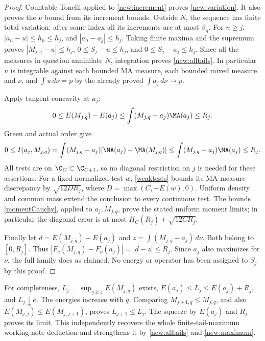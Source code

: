 \begin{proof}
Countable Tonelli applied to \eqref{new:increment} proves
\eqref{new:variation}. It also proves the $\nu$ bound from its
increment bounds. Outside $N$, the sequence has finite total variation:
after some index all its increments are at most $\beta_n$. For
$n\ge j$, $|a_n-u|\le h_n\le h_j$, and
$|a_n-a_j|\le h_j$. Taking finite maxima and the supremum proves
$|M_{j,q}-u|\le h_j$, $0\le S_j-u\le h_j$, and
$0\le S_j-a_j\le h_j$. Since all the measures in question annihilate
$N$, integration proves \eqref{new:alltails}. In particular $u$ is
integrable against each bounded MA measure, each bounded mixed measure
and $\nu$, and $\int u\,d\nu=p$ by the already proved
$\int a_j\,d\nu\to p$.

Apply tangent concavity at $a_j$:
\[
 0\le E(M_{j,q})-E(a_j)
 \le\int(M_{j,q}-a_j)\MA(a_j)\le R_j.
\]
Green and actual order give
\[
 0\le I(a_j,M_{j,q})
 =\int(M_{j,q}-a_j)[\MA(a_j)-\MA(M_{j,q})]
 \le\int(M_{j,q}-a_j)\MA(a_j)\le R_j.
\]
All tests are on $\C_C\subset\C_{C+1}$, so no diagonal restriction
on $j$ is needed for these assertions. For a fixed normalized test $w$,
\eqref{weaktests} bounds its MA-measure discrepancy by
$\sqrt{12D R_j}$, where $D=\max(C,-E(w),0)$.
Uniform density and common mass extend the conclusion to every
continuous test. The bounds \eqref{momentCauchy}, applied to
$a_j,M_{j,q}$, prove the stated uniform moment limits; in particular
the diagonal error is at most $H_C(R_j)+\sqrt{12CR_j}$.

Finally let $d=E(M_{j,q})-E(a_j)$ and
$z=\int(M_{j,q}-a_j)\,d\nu$. Both belong to $[0,R_j]$.
Thus $|F_\nu(M_{j,q})-F_\nu(a_j)|=|d-z|\le R_j$.
Since $a_j$ also maximizes for $\nu$, the full family does as claimed.
No energy or operator has been assigned to $S_j$ by this proof.
\end{proof}

For completeness, $L_j=\sup_{q\ge j}E(M_{j,q})$ exists,
$E(a_j)\le L_j\le E(a_j)+R_j$, and $L_j\downarrow e$.
The energies increase with $q$. Comparing
$M_{j+1,q}\le M_{j,q}$, and also
$E(M_{j,j})\le E(M_{j,j+1})$, proves $L_{j+1}\le L_j$.
The squeeze by $E(a_j)$ and $R_j$ proves its limit. This independently
recovers the whole finite-tail-maximum working-note deduction and
strengthens it by \eqref{new:alltails} and \eqref{new:maximum}.

